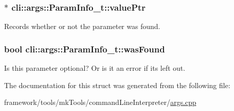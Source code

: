 \subsubsection[{\texorpdfstring{value\+Ptr}{valuePtr}}]{$\ast$ cli\+::args\+::\+Param\+Info\+\_\+t\+::value\+Ptr}\hypertarget{structcli_1_1args_1_1_param_info__t_a655cf4f95a7cb652312c1ac7d4399b83}{}\label{structcli_1_1args_1_1_param_info__t_a655cf4f95a7cb652312c1ac7d4399b83}


Records whether or not the parameter was found. 

\subsubsection[{\texorpdfstring{was\+Found}{wasFound}}]{\setlength{\rightskip}{0pt plus 5cm}bool cli\+::args\+::\+Param\+Info\+\_\+t\+::was\+Found}\hypertarget{structcli_1_1args_1_1_param_info__t_a990cda95eccfe2275ff6814f032fd102}{}\label{structcli_1_1args_1_1_param_info__t_a990cda95eccfe2275ff6814f032fd102}
Is this parameter optional? Or is it an error if it\textquotesingle{}s left out. 

The documentation for this struct was generated from the following file\+:\begin{DoxyCompactItemize}
\item 
framework/tools/mk\+Tools/command\+Line\+Interpreter/\hyperlink{args_8cpp}{args.\+cpp}\end{DoxyCompactItemize}
